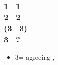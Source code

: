 \documentclass[12pt, a4paper]{article}
\begin{document}
\subsubsection*{1\hearts -- 1\spades\\
                2\hearts -- 2\nt\\
                (3\clubs -- 3\diams)\\
                3\hearts -- ?}
\begin{itemize}
    \item 3\spades = agreeing \hearts, \lsf
\end{itemize}

\end{document}
